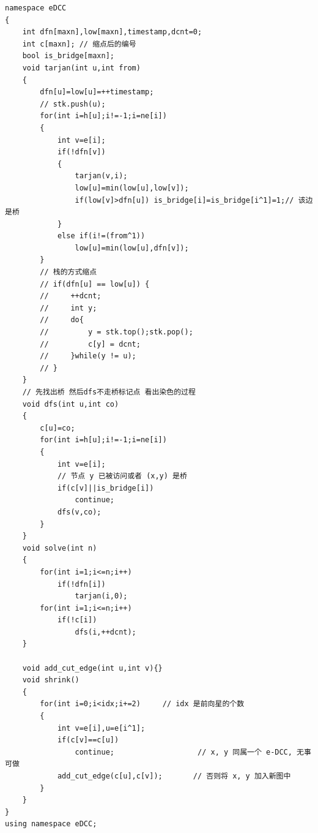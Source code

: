 \begin{verbatim}
namespace eDCC
{
    int dfn[maxn],low[maxn],timestamp,dcnt=0;
    int c[maxn]; // 缩点后的编号
    bool is_bridge[maxn];
    void tarjan(int u,int from)
    {
        dfn[u]=low[u]=++timestamp;
        // stk.push(u);
        for(int i=h[u];i!=-1;i=ne[i])
        {
            int v=e[i];
            if(!dfn[v])
            {
                tarjan(v,i);
                low[u]=min(low[u],low[v]);
                if(low[v]>dfn[u]) is_bridge[i]=is_bridge[i^1]=1;// 该边是桥
            }
            else if(i!=(from^1))
                low[u]=min(low[u],dfn[v]);
        }
        // 栈的方式缩点
        // if(dfn[u] == low[u]) {
        //     ++dcnt;
        //     int y;
        //     do{
        //         y = stk.top();stk.pop();
        //         c[y] = dcnt;
        //     }while(y != u);
        // }
    }
    // 先找出桥 然后dfs不走桥标记点 看出染色的过程
    void dfs(int u,int co)
    {
        c[u]=co;
        for(int i=h[u];i!=-1;i=ne[i])
        {
            int v=e[i];
            // 节点 y 已被访问或者 (x,y) 是桥 
            if(c[v]||is_bridge[i])
                continue;
            dfs(v,co);
        }
    }
    void solve(int n)
    {
        for(int i=1;i<=n;i++)
            if(!dfn[i])
                tarjan(i,0);
        for(int i=1;i<=n;i++)
            if(!c[i])
                dfs(i,++dcnt);
    }

    void add_cut_edge(int u,int v){}
    void shrink()
    {
        for(int i=0;i<idx;i+=2)     // idx 是前向星的个数
        {
            int v=e[i],u=e[i^1];
            if(c[v]==c[u])
                continue;                   // x, y 同属一个 e-DCC, 无事可做
            add_cut_edge(c[u],c[v]);       // 否则将 x, y 加入新图中
        }
    }    
}
using namespace eDCC;
\end{verbatim}